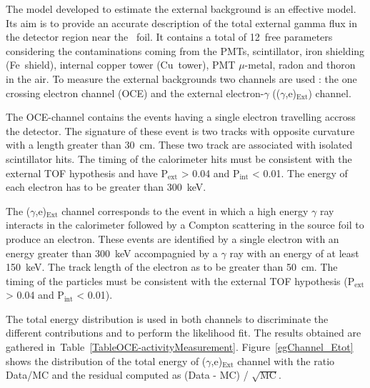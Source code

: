 \documentclass[main.tex]{subfiles}
\begin{document}
\bigskip


\NI The model developed to estimate the external background is an effective model. Its aim is to provide an accurate description of the total external gamma flux in the detector region near the \Cd~foil. It contains a total of 12~free parameters considering the contaminations coming from the PMTs, scintillator, iron shielding (Fe~shield), internal copper tower (Cu~tower), PMT $\mu$-metal, radon and thoron in the air. To measure the external backgrounds two channels are used : the one crossing electron channel (OCE) and the external electron-$\gamma$ (($\gamma$,e)$_{\text{Ext}}$) channel.


\bigskip


\NI The OCE-channel contains the events having a single electron travelling accross the detector. The signature of these event is two tracks with opposite curvature with a length greater than 30~cm. These two track are associated with isolated scintillator hits. The timing of the calorimeter hits must be consistent with the external TOF hypothesis and have P$_{\text{ext}}$ > 0.04 and P$_{\text{int}}$ < 0.01. The energy of each electron has to be greater than 300~keV.


\bigskip


\NI The ($\gamma$,e)$_{\text{Ext}}$ channel corresponds to the event in which a high energy $\gamma$ ray interacts in the calorimeter followed by a Compton scattering in the source foil to produce an electron. These events are identified by a single electron with an energy greater than 300~keV accompagnied by a $\gamma$ ray with an energy of at least 150~keV. The track length of the electron as to be greater than 50~cm. The timing of the particles must be consistent with the external TOF hypothesis (P$_{\text{ext}}$ > 0.04 and P$_{\text{int}}$ < 0.01).


\bigskip


\NI The total energy distribution is used in both channels to discriminate the different contributions and to perform the likelihood fit. The results obtained are gathered in~Table~\ref{TableOCE-activityMeasurement}. Figure~\ref{egChannel_Etot} shows the distribution of the total energy of ($\gamma$,e)$_{\text{Ext}}$ channel with the ratio Data/MC and the residual computed as (Data - MC) / $\sqrt{\text{MC}}$. 
\end{document}
